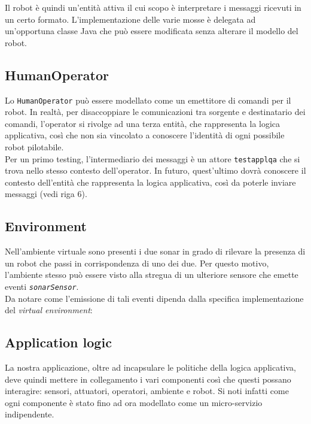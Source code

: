 \documentclass{../llncs}
\begin{document}
Il robot è quindi un'entità attiva il cui scopo è interpretare i messaggi ricevuti in un certo formato. L'implementazione delle varie mosse è delegata ad un'opportuna classe Java che può essere modificata senza alterare il modello del robot.\\



\subsection{HumanOperator}
Lo \texttt{HumanOperator} può essere modellato come un emettitore di comandi per il robot. In realtà, per disaccoppiare le comunicazioni tra sorgente e destinatario dei comandi, l'operator si rivolge ad una terza entità, che rappresenta la logica applicativa, così che non sia vincolato a conoscere l'identità di ogni possibile robot pilotabile.\\



Per un primo testing, l'intermediario dei messaggi è un attore \texttt{testapplqa} che si trova nello stesso contesto dell'operator. In futuro, quest'ultimo dovrà conoscere il contesto dell'entità che rappresenta la logica applicativa, così da poterle inviare messaggi (vedi riga 6).

\subsection{Environment}
Nell'ambiente virtuale sono presenti i due sonar in grado di rilevare la presenza di un robot che passi in corrispondenza di uno dei due. Per questo motivo, l'ambiente stesso può essere visto alla stregua di un ulteriore sensore che emette eventi \texttt{\textit{sonarSensor}}.\\



Da notare come l'emissione di tali eventi dipenda dalla specifica implementazione del \textit{virtual environment}:



\subsection{Application logic}
La nostra applicazione, oltre ad incapsulare le politiche della logica applicativa, deve quindi mettere in collegamento i vari componenti così che questi possano interagire: sensori, attuatori, operatori, ambiente e robot. Si noti infatti come ogni componente è stato fino ad ora modellato come un micro-servizio indipendente.
\end{document}
